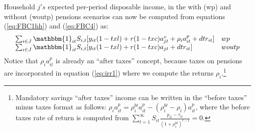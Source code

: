 \documentclass{article}
\begin{document}
\begin{enumerate}
Household $j's$ expected per-period disposable income, in the with (wp) and without (woutp) pensions scenarios can now be computed from equations (\ref{eq:FBC1hh}) and (\ref{eq:FBC4}) as:
\begin{equation} \label{eq:hh_income}
    \begin{array}{ll}
        \sum_{i\in J} \mathbbm{1}_{it}S_{i,t} [y_{it}(1-txl) +r(1-txc) a_{jt}^v+\rho_i a_{it}^p +dtr_{it}]  & wp   \\
         \sum_{i\in J} \mathbbm{1}_{it}S_{i,t}[y_{it}(1-txl)+r(1-txc) a_{jt} +dtr_{it} ] &  woutp 
    \end{array}
\end{equation}
Notice that $\rho_i a_{it}^p$ is already an ``after taxes'' concept, because taxes on pensions are incorporated in equation (\ref{eq:irr1}) where we compute the returns $\rho_i$.\footnote{Mandatory savings ``after taxes'' income can be written in the ``before taxes'' minus taxes format as follows: $\rho_i a_{it}^p = \rho^{bt}_i a_{it}^p - (\rho^{bt}_i - \rho_i)a_{it}^p $, where the before taxes rate of return is computed from $ \sum_{t=1}^\infty S_{it} \frac{p_{it}-\tau_{it}}{(1+{\rho^{bt}_i})^{t-1}}=0$. } 


\end{enumerate}
\end{document}
